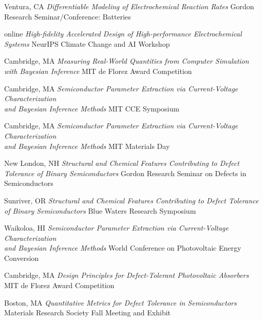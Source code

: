     {Ventura, CA}
    {\textit{Differentiable Modeling of Electrochemical Reaction Rates}}
    {Gordon Research Seminar/Conference: Batteries}

\vspace{-2mm}
    {online}
    {\textit{High-fidelity Accelerated Design of High-performance Electrochemical Systems}}
    {NeurIPS Climate Change and AI Workshop}

\vspace{-2mm}
    {Cambridge, MA}
    {\textit{Measuring Real-World Quantities from Computer Simulation with Bayesian Inference}}
    {MIT de Florez Award Competition}

\vspace{-3mm}
\datedsubsection{}
    {Cambridge, MA}
    {\textit{Semiconductor Parameter Extraction via Current-Voltage Characterization \\and Bayesian Inference Methods}}
    {MIT CCE Symposium}

\vspace{-2mm}
    {Cambridge, MA}
    {\textit{Semiconductor Parameter Extraction via Current-Voltage Characterization \\and Bayesian Inference Methods}}
    {MIT Materials Day}

\vspace{-3mm}
\datedsubsection{}
    {New London, NH}
    {\textit{Structural and Chemical Features Contributing to Defect Tolerance of Binary Semiconductors}}
    {Gordon Research Seminar on Defects in Semiconductors}

\vspace{-3mm}
\datedsubsection{}
    {Sunriver, OR}
    {\textit{Structural and Chemical Features Contributing to Defect Tolerance of Binary Semiconductors}}
    {Blue Waters Research Symposium}

\vspace{-3mm}
\datedsubsection{}
    {Waikoloa, HI}
    {\textit{Semiconductor Parameter Extraction via Current-Voltage Characterization \\and Bayesian Inference Methods}}
    {World Conference on Photovoltaic Energy Conversion}

\vspace{-3mm}
\datedsubsection{}
    {Cambridge, MA}
    {\textit{Design Principles for Defect-Tolerant Photovoltaic Absorbers}}
    {MIT de Florez Award Competition}

\vspace{-2mm}
    {Boston, MA}
    {\textit{Quantitative Metrics for Defect Tolerance in Semiconductors}}
    {Materials Research Society Fall Meeting and Exhibit}

